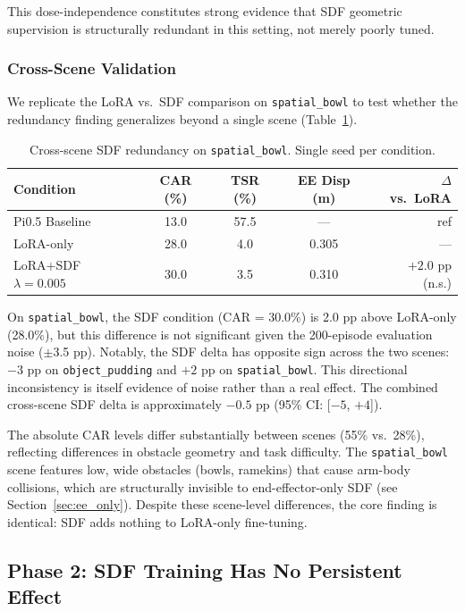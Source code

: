 \documentclass[10pt,letterpaper]{article}
\begin{document}
This dose-independence constitutes strong evidence that SDF geometric supervision is structurally redundant in this setting, not merely poorly tuned.

\subsubsection{Cross-Scene Validation}
\label{sec:cross_scene}

We replicate the LoRA vs.\ SDF comparison on \texttt{spatial\_bowl} to test whether the redundancy finding generalizes beyond a single scene (Table~\ref{tab:spatial}).

\begin{table}[t]
\centering
\caption{Cross-scene SDF redundancy on \texttt{spatial\_bowl}. Single seed per condition.}
\label{tab:spatial}
\begin{tabular}{lcccr}
\toprule
Condition & CAR (\%) & TSR (\%) & EE Disp (m) & $\Delta$ vs.\ LoRA \\
\midrule
Pi0.5 Baseline & 13.0 & 57.5 & --- & ref \\
LoRA-only & 28.0 & 4.0 & 0.305 & --- \\
LoRA+SDF $\lambda{=}0.005$ & 30.0 & 3.5 & 0.310 & $+2.0$ pp (n.s.) \\
\bottomrule
\end{tabular}
\end{table}

On \texttt{spatial\_bowl}, the SDF condition (CAR = 30.0\%) is 2.0 pp above LoRA-only (28.0\%), but this difference is not significant given the 200-episode evaluation noise ($\pm$3.5 pp). Notably, the SDF delta has opposite sign across the two scenes: $-3$ pp on \texttt{object\_pudding} and $+2$ pp on \texttt{spatial\_bowl}. This directional inconsistency is itself evidence of noise rather than a real effect. The combined cross-scene SDF delta is approximately $-0.5$ pp (95\% CI: [$-5$, $+4$]).

The absolute CAR levels differ substantially between scenes (55\% vs.\ 28\%), reflecting differences in obstacle geometry and task difficulty. The \texttt{spatial\_bowl} scene features low, wide obstacles (bowls, ramekins) that cause arm-body collisions, which are structurally invisible to end-effector-only SDF (see Section~\ref{sec:ee_only}). Despite these scene-level differences, the core finding is identical: SDF adds nothing to LoRA-only fine-tuning.

\subsection{Phase 2: SDF Training Has No Persistent Effect}
\label{sec:phase2}
\end{document}
